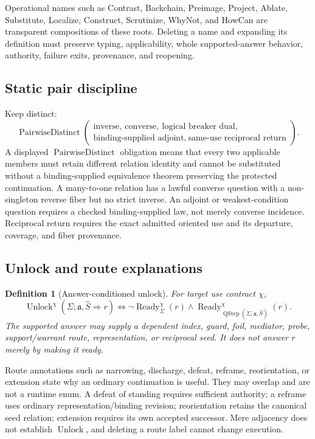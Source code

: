 \documentclass[11pt,oneside]{article}
\newtheorem{definition}{Definition}[section]
\newcommand{\Unlock}{\operatorname{Unlock}}
\newcommand{\Ready}{\operatorname{Ready}}
\newcommand{\QStep}{\operatorname{QStep}}
\newcommand{\AskRef}{\mathfrak a}
\begin{document}
Operational names such as \textsf{Contrast}, \textsf{Backchain}, \textsf{Preimage},
\textsf{Project}, \textsf{Ablate}, \textsf{Substitute}, \textsf{Localize}, \textsf{Construct},
\textsf{Scrutinize}, \textsf{WhyNot}, and \textsf{HowCan} are transparent compositions of these
roots.  Deleting a name and expanding its definition must preserve typing, applicability, whole
supported-answer behavior, authority, failure exits, provenance, and reopening.

\subsection{Static pair discipline}

Keep distinct:
\[
\boxed{
\operatorname{PairwiseDistinct}
\left(
\begin{gathered}
\text{inverse},\ \text{converse},\ \text{logical breaker dual},\\
\text{binding-supplied adjoint},\ \text{same-use reciprocal return}
\end{gathered}
\right).
}
\]
A displayed \(\operatorname{PairwiseDistinct}\) obligation means that every two applicable members
must retain different relation identity and cannot be substituted without a binding-supplied
equivalence theorem preserving the protected continuation.
A many-to-one relation has a lawful converse question with a non-singleton reverse fiber but no
strict inverse.  An adjoint or weakest-condition question requires a checked binding-supplied law,
not merely converse incidence.  Reciprocal return requires the exact admitted oriented use and its
departure, coverage, and fiber provenance.

\subsection{Unlock and route explanations}

\begin{definition}[Answer-conditioned unlock]\label{def:q-unlock}
For target use contract \(\chi\),
\[
\boxed{
\Unlock^{\chi}(\Sigma;\AskRef,\widehat S\Rightarrow r)
\iff
\neg\Ready^{\chi}_{\Sigma}(r)
\land
\Ready^{\chi}_{\QStep(\Sigma,\AskRef,\widehat S)}(r).
}
\]
The supported answer may supply a dependent index, guard, foil, mediator, probe, support/warrant
route, representation, or reciprocal seed.  It does not answer \(r\) merely by making it ready.
\end{definition}

Route annotations such as narrowing, discharge, defeat, reframe, reorientation, or extension state
why an ordinary continuation is useful.  They may overlap and are not a runtime enum.  A defeat of
standing requires sufficient authority; a reframe uses ordinary representation/binding revision;
reorientation retains the canonical seed relation; extension requires its own accepted successor.
Mere adjacency does not establish \(\Unlock\), and deleting a route label cannot change execution.
\end{document}
